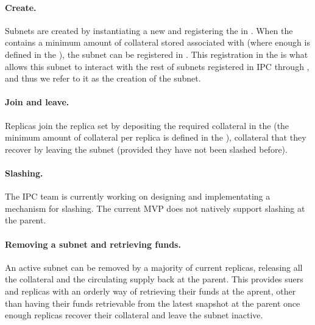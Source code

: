\paragraph{Create.} Subnets are created by instantiating a new \sa and registering the \sa in \gw. When the \gw contains a minimum amount of collateral stored associated with \sa (where enough is defined in the \gw), the subnet can be registered in \gw. This registration in the \gw is what allows this subnet to interact with the rest of subnets registered in IPC through \gw, and thus we refer to it as the creation of the subnet. 
\paragraph{Join and leave.} Replicas join the replica set by depositing the required collateral in the \gw (the minimum amount of collateral per replica is defined in the \sa), collateral that they recover by leaving the subnet (provided they have not been slashed before).
 
\paragraph{Slashing.} The IPC team is currently working on designing and implementating a mechanism for slashing. The current MVP does not natively support slashing at the parent. 
\paragraph{Removing a subnet and retrieving funds.} An active subnet can be removed by a majority of current replicas, releasing all the collateral and the circulating supply back at the parent. This provides suers and replicas with an orderly way of retrieving their funds at the aprent, other than having their funds retrievable from the latest snapshot at the parent once enough replicas recover their collateral and leave the subnet inactive.

